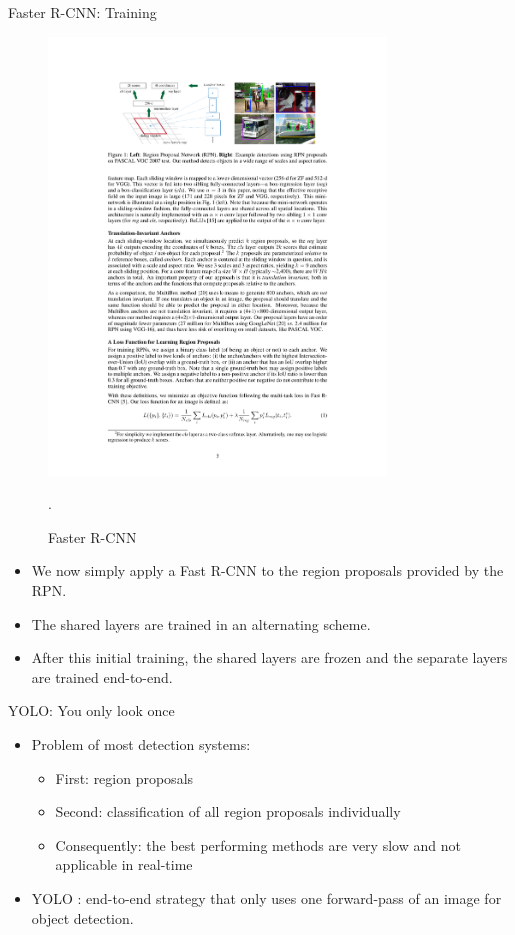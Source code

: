 \documentclass[xcolor=pdftex,dvipsnames,table]{beamer}
\begin{document}
\begin{frame}{Faster R-CNN: Training}
\begin{figure}[htb]
   \centering
   \includegraphics[width=0.8\textwidth]{../graphics/Faster_R-CNN.pdf}
   \caption{Faster R-CNN \cite{Ren2017}}.
\end{figure}
\begin{itemize}
\item We now simply apply a Fast R-CNN to the region proposals provided by the RPN.
\item The shared layers are trained in an alternating scheme.
\item After this initial training, the shared layers are frozen and the separate layers are trained end-to-end.
\end{itemize}
\end{frame}

\begin{frame}{YOLO: You only look once}
\begin{itemize}
\item Problem of most detection systems: 
\begin{itemize}
\item First: region proposals 
\item Second: classification of all region proposals individually
\item Consequently: the best performing methods are very slow and not applicable in real-time
\end{itemize}
\item YOLO \cite{Redmon2016}: end-to-end strategy that only uses one forward-pass of an image for object detection. 
\end{itemize}
\end{frame}
\end{document}
